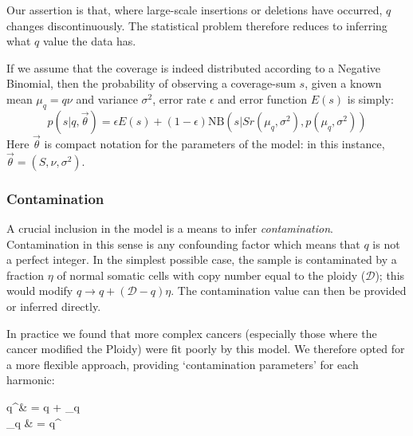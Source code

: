 \documentclass[fleqn,usenatbib]{mnras}
\begin{document}
{{					Our assertion is that, where large-scale insertions or deletions have occurred, $q$ changes discontinuously. The statistical problem therefore reduces to inferring what $q$ value the data has. 
					
					If we assume that the coverage is indeed distributed according to a Negative Binomial, then the probability of observing a coverage-sum $s$, given a known mean $\mu_q = q\nu$ and variance $\sigma^2$, error rate $\epsilon$ and error function $E(s)$ is simply:
					\begin{equation}
						p(s | q, \vec{\theta}) = \epsilon E(s) + (1 - \epsilon) \text{NB}(s| S r(\mu_q,\sigma^2), p(\mu_q,\sigma^2))
					\end{equation} 
					Here $\vec{\theta}$ is compact notation for the parameters of the model: in this instance, $\vec{\theta} = (S,\nu,\sigma^2)$.
					\subsubsection{Contamination}

						A crucial inclusion in the model is a means to infer \textit{contamination}. Contamination in this sense is any confounding factor which means that $q$ is not a perfect integer. In the simplest possible case, the sample is contaminated by a fraction $\eta$ of normal somatic cells with copy number equal to the ploidy ($\mathcal{D}$); this would modify $q \to q + (\mathcal{D} - q) \eta$. The contamination value can then be provided or inferred directly.

						In practice we found that more complex cancers (especially those where the cancer modified the Ploidy) were fit poorly by this model. We therefore opted for a more flexible approach, providing `contamination parameters' for each harmonic:
						\begin{spalign}
							q^\prime & = q + \delta_q 
							\\
							\mu_q & = q^\prime \nu
						\end{spalign}
						
						

}}
\end{document}
